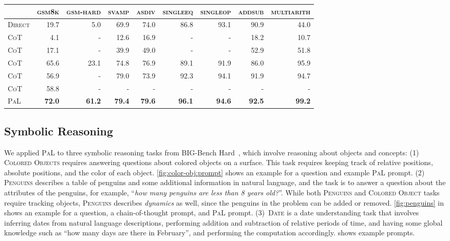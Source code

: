 \documentclass[dvipsnames]{article} \usepackage[accepted]{icml2022}
\newcommand{\ours}{\textsc{PaL}\xspace}
\newcommand{\cotp}{\textsc{CoT}\xspace}
\newcommand{\direct}{\textsc{Direct}\xspace}
\newcommand{\gsm}{\textsc{gsm8k}\xspace}
\newcommand{\gsmhard}{\textsc{gsm-hard}\xspace}
\newcommand{\multiarith}{\textsc{multiarith}\xspace}
\newcommand{\singleop}{\textsc{singleop}\xspace}
\newcommand{\singleeq}{\textsc{singleeq}\xspace}
\newcommand{\addsub}{\textsc{addsub}\xspace}
\newcommand{\asdiv}{\textsc{asdiv}\xspace}
\newcommand{\svamp}{\textsc{svamp}\xspace}
\newcommand{\largepalm}{\textsc{P}a\textsc{LM}\textsc{-540b}\xspace}
\begin{document}
\begin{table*}[]
\centering
\begin{tabular}{lrrrrrrrr}
\toprule
      & \gsm           & \gsmhard & \svamp         & \asdiv         & \singleeq & \singleop & \addsub & \multiarith \\ \midrule
\direct  & 19.7 & 5.0 & 69.9 & 74.0 & 86.8 &  93.1 & 90.9 & 44.0\\
\cotp  & 4.1 &  - & 12.6 & 16.9 & - & - & 18.2 & 10.7 \\
\cotp & 17.1 & - & 39.9 & 49.0 & - & - & 52.9 & 51.8 \\
\cotp  & 65.6 & 23.1 & 74.8 & 76.9 & 89.1 & 91.9 & 86.0 & 95.9 \\
\cotp &   56.9   & - &   79.0   &  73.9     &    92.3  &     94.1 & 91.9     &   94.7   \\
\cotp  & 58.8  & - & - & - & - & - & - & -\\
\ours & \textbf{72.0} & \textbf{61.2} &\textbf{79.4} & \textbf{79.6} & \textbf{96.1}  & \textbf{94.6}  & \textbf{92.5} & \textbf{99.2}  \\ 
\bottomrule
\end{tabular}
\caption{Problem solve rate~(\%) on mathematical reasoning datasets. The highest number on each task is in \textbf{bold}.
The results for \direct and \largepalm are from \citet{wei2022chain}, the results for LaMDA and UL2 are from \citet{wang2022self}, and the results for Minerva are from \citet{minerva}. 
We ran \ours on each benchmark 3 times and report the average; the standard deviation is provided in .
} 
\label{tab:math:mainresults}
\end{table*} 

\subsection{Symbolic Reasoning}
\label{sec:objects}
We applied \ours to three symbolic reasoning tasks from BIG-Bench Hard~\citep{Suzgun2022ChallengingBT}, which involve reasoning about objects and concepts:
(1) \textsc{Colored Objects} requires answering questions about colored objects on a surface.
This task requires keeping track of relative positions, absolute positions, and the color of each object.
\autoref{fig:color-obj:prompt} shows an example for a question and 
example \ours prompt.
(2) \textsc{Penguins} describes a table of penguins and some additional information in natural language, and the task is to answer a question about the attributes of the penguins, for example, ``\emph{how many penguins are less than 8 years old?}''. 
While both \textsc{Penguins} and \textsc{Colored Object} tasks require tracking objects, \textsc{Penguins} describes \emph{dynamics} as well, since the penguins in the problem can be added or removed.
\autoref{fig:penguins} in  shows an example for a question, a chain-of-thought prompt, and \ours prompt.
(3)~\textsc{Date} is a date understanding task that involves inferring dates from natural language descriptions, performing addition and subtraction of relative periods of time, and having some global knowledge such as ``how many days are there in February'', and performing the computation accordingly.
 shows example prompts.
\end{document}
